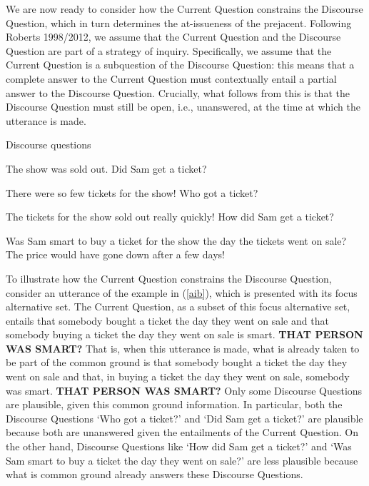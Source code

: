 \documentclass[11pt,fleqn]{article}
\newcommand{\6}{\mbox{$[\hspace*{-.6mm}[$}}
\newcommand{\9}{\mbox{$]\hspace*{-.6mm}]$}}
\begin{document}
We are now ready to consider how the Current Question constrains the Discourse Question, which in turn determines the at-issueness of the prejacent.  Following Roberts 1998/2012\nocite{roberts98,roberts12}, we assume that the Current Question and the Discourse Question are part of a strategy of inquiry. Specifically, we assume that the Current Question is a subquestion of the Discourse Question: this means that a complete answer to the Current Question must contextually entail a partial answer to the Discourse Question. Crucially, what follows from this is that the Discourse Question must still be open, i.e., unanswered, at the time at which the utterance is made. 

Discourse questions
\begin{itemize}
 The show was sold out. Did Sam get a ticket?

 There were so few tickets for the show! Who got a ticket?

 The tickets for the show sold out really quickly! How did Sam get a ticket?

 Was Sam smart to buy a ticket for the show the day the tickets went on sale? The price would have gone down after a few days!
\end{itemize}

To illustrate how the Current Question constrains the Discourse Question, consider an utterance of the example in (\ref{aib}), which is presented with its focus alternative set. The Current Question, as a subset of this focus alternative set, entails that somebody bought a ticket the day they went on sale and that somebody buying a ticket the day they went on sale is smart. {\bf THAT PERSON WAS SMART?}  That is, when this utterance is made, what is already taken to be part of the common ground is that somebody bought a ticket the day they went on sale and that, in buying a ticket the day they went on sale, somebody was smart. {\bf THAT PERSON WAS SMART?} Only some Discourse Questions are plausible, given this common ground information. In particular, both the Discourse Questions `Who got a ticket?' and `Did Sam get a ticket?' are plausible because both are unanswered given the entailments of the Current Question. On the other hand, Discourse Questions like `How did Sam get a ticket?' and `Was Sam smart to buy a ticket the day they went on sale?' are less plausible because what is common ground already answers these Discourse Questions.
\end{document}
